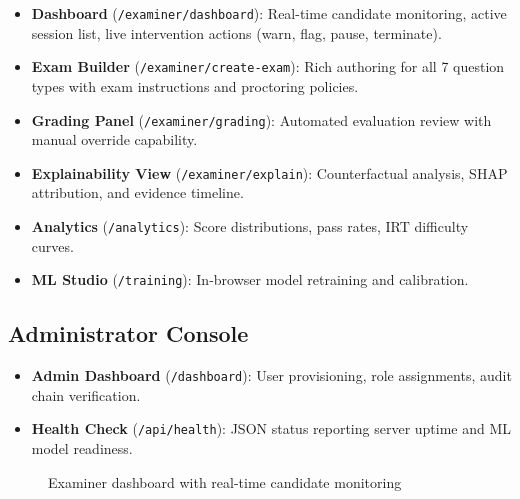 \documentclass{article}
\begin{document}
\begin{itemize}
    \item \textbf{Dashboard} (\texttt{/examiner/dashboard}): Real-time candidate monitoring, active session list, live intervention actions (warn, flag, pause, terminate).
    \item \textbf{Exam Builder} (\texttt{/examiner/create-exam}): Rich authoring for all 7 question types with exam instructions and proctoring policies.
    \item \textbf{Grading Panel} (\texttt{/examiner/grading}): Automated evaluation review with manual override capability.
    \item \textbf{Explainability View} (\texttt{/examiner/explain}): Counterfactual analysis, SHAP attribution, and evidence timeline.
    \item \textbf{Analytics} (\texttt{/analytics}): Score distributions, pass rates, IRT difficulty curves.
    \item \textbf{ML Studio} (\texttt{/training}): In-browser model retraining and calibration.
\end{itemize}

\subsection{Administrator Console}

\begin{itemize}
    \item \textbf{Admin Dashboard} (\texttt{/dashboard}): User provisioning, role assignments, audit chain verification.
    \item \textbf{Health Check} (\texttt{/api/health}): JSON status reporting server uptime and ML model readiness.
\end{itemize}

\begin{figure}[H]
    \centering
    \caption{Examiner dashboard with real-time candidate monitoring}
    \label{fig:examiner_dashboard}
\end{figure}
\end{document}
